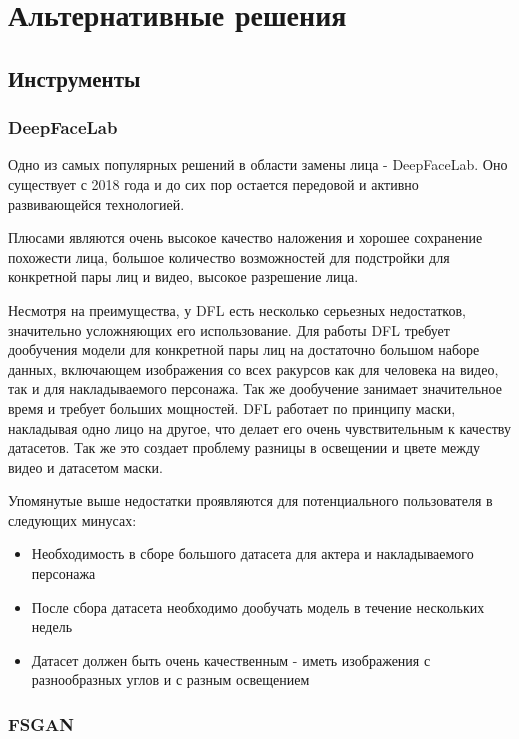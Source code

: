 \section{Альтернативные решения}

\subsection*{Инструменты}

\subsubsection{DeepFaceLab}

Одно из самых популярных решений в области замены лица - DeepFaceLab\cite{deepfacelab}. Оно существует с 2018 года и до сих пор остается передовой и активно развивающейся технологией.

Плюсами являются очень высокое качество наложения и хорошее сохранение похожести лица, большое количество возможностей для подстройки для конкретной пары лиц и видео, высокое разрешение лица.

Несмотря на преимущества, у DFL есть несколько серьезных недостатков, значительно усложняющих его использование. Для работы DFL требует дообучения модели для конкретной пары лиц на достаточно большом наборе данных, включающем изображения со всех ракурсов как для человека на видео, так и для накладываемого персонажа.
Так же дообучение занимает значительное время и требует больших мощностей.
DFL работает по принципу маски, накладывая одно лицо на другое, что делает его очень чувствительным к качеству датасетов. Так же это создает проблему разницы в освещении и цвете между видео и датасетом маски.

Упомянутые выше недостатки проявляются для потенциального пользователя в следующих минусах:

\begin{itemize}
    \item Необходимость в сборе большого датасета для актера и накладываемого персонажа
    \item После сбора датасета необходимо дообучать модель в течение нескольких недель
    \item Датасет должен быть очень качественным - иметь изображения с разнообразных углов и с разным освещением
\end{itemize}

\subsubsection{FSGAN}

